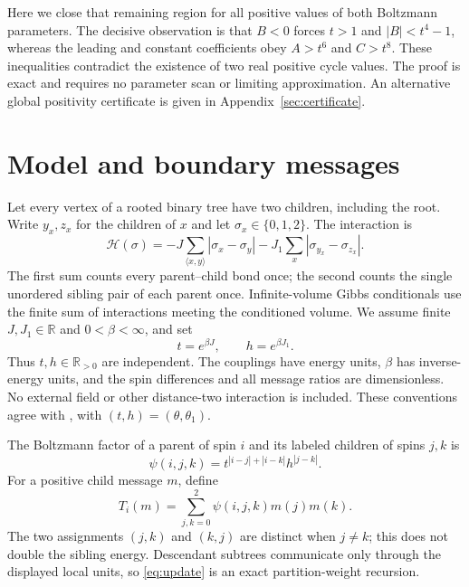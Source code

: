 \documentclass[11pt,a4paper]{article}
\numberwithin{equation}{section}
\newcommand{\Rplus}{\mathbb{R}_{>0}}
\begin{document}
Here we close that remaining region for all positive values of both
Boltzmann parameters. The decisive observation is that $B<0$ forces
$t>1$ and $|B|<t^4-1$, whereas the leading and constant coefficients
obey $A>t^6$ and $C>t^8$. These inequalities contradict the existence
of two real positive cycle values. The proof is exact and requires no
parameter scan or limiting approximation. An alternative global
positivity certificate is given in Appendix~\ref{sec:certificate}.

\section{Model and boundary messages}
\label{sec:model}
Let every vertex of a rooted binary tree have two children, including
the root. Write $y_x,z_x$ for the children of $x$ and let
$\sigma_x\in\{0,1,2\}$. The interaction is
\begin{equation}
 \mathcal H(\sigma)
 =-J\sum_{\langle x,y\rangle}|\sigma_x-\sigma_y|
  -J_1\sum_x|\sigma_{y_x}-\sigma_{z_x}|.
 \label{eq:hamiltonian}
\end{equation}
The first sum counts every parent--child bond once; the second counts
the single unordered sibling pair of each parent once. Infinite-volume
Gibbs conditionals use the finite sum of interactions meeting the
conditioned volume. We assume finite $J,J_1\in\mathbb R$ and
$0<\beta<\infty$, and set
\begin{equation}
 t=e^{\beta J},\qquad h=e^{\beta J_1}.
 \label{eq:parameters}
\end{equation}
Thus $t,h\in\Rplus$ are independent. The couplings have energy units,
$\beta$ has inverse-energy units, and the spin differences and all message
ratios are dimensionless. No external field or other distance-two
interaction is included. These conventions agree with
\citet[Eq.~(1)]{KR2025}, with $(t,h)=(\theta,\theta_1)$.

The Boltzmann factor of a parent of spin $i$ and its labeled children
of spins $j,k$ is
\begin{equation}
 \psi(i,j,k)=t^{|i-j|+|i-k|}h^{|j-k|}.
 \label{eq:factor}
\end{equation}
For a positive child message $m$, define
\begin{equation}
 T_i(m)=\sum_{j,k=0}^{2}\psi(i,j,k)m(j)m(k).
 \label{eq:update}
\end{equation}
The two assignments $(j,k)$ and $(k,j)$ are distinct when $j\ne k$;
this does not double the sibling energy. Descendant subtrees communicate
only through the displayed local units, so \eqref{eq:update} is an exact
partition-weight recursion.
\end{document}
